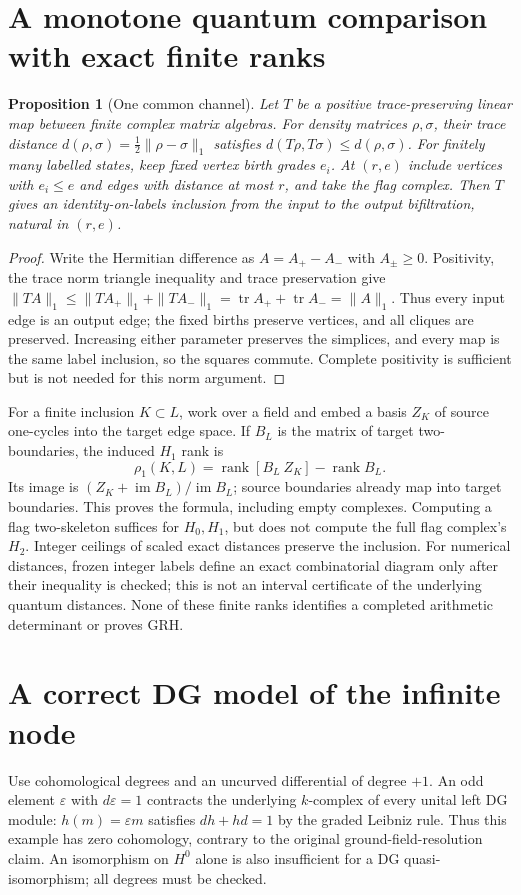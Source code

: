 \documentclass[11pt,oneside,openany]{book}
\newtheorem{proposition}[theorem]{Proposition}
\theoremstyle{definition}\newtheorem{definition}[theorem]{Definition}
\theoremstyle{remark}\newtheorem{remark}[theorem]{Remark}
\begin{document}
\section{A monotone quantum comparison with exact finite ranks}
\begin{proposition}[One common channel]\label{thm:channel-filtration}
Let $T$ be a positive trace-preserving linear map between finite complex
matrix algebras. For density matrices $\rho,\sigma$, their trace distance
$d(\rho,\sigma)=\tfrac12\|\rho-\sigma\|_1$ satisfies
$d(T\rho,T\sigma)\le d(\rho,\sigma)$.
For finitely many labelled states, keep fixed vertex birth grades $e_i$.
At $(r,e)$ include vertices with $e_i\le e$ and edges with distance at most
$r$, and take the flag complex. Then $T$ gives an identity-on-labels inclusion
from the input to the output bifiltration, natural in $(r,e)$.
\end{proposition}
\begin{proof}
Write the Hermitian difference as $A=A_+-A_-$ with $A_\pm\ge0$.
Positivity, the trace norm triangle inequality and trace preservation give
$\|T A\|_1\le\|T A_+\|_1+\|T A_-\|_1
=\operatorname{tr}A_++\operatorname{tr}A_-=\|A\|_1$.
Thus every input edge is an output edge; the fixed births preserve vertices,
and all cliques are preserved. Increasing either parameter preserves the
simplices, and every map is the same label inclusion, so the squares commute.
Complete positivity is sufficient but is not needed for this norm argument.
\end{proof}
For a finite inclusion $K\subset L$, work over a field and embed a basis
$Z_K$ of source one-cycles into the target edge space. If $B_L$ is the
matrix of target two-boundaries, the induced $H_1$ rank is
\[
 \rho_1(K,L)=\operatorname{rank}[B_L\ Z_K]-\operatorname{rank}B_L.
\]
Its image is $(Z_K+\operatorname{im}B_L)/\operatorname{im}B_L$; source
boundaries already map into target boundaries. This proves the formula,
including empty complexes. Computing a flag two-skeleton suffices for
$H_0,H_1$, but does not compute the full flag complex's $H_2$.
Integer ceilings of scaled exact distances preserve the inclusion.
For numerical distances, frozen integer labels define an exact combinatorial
diagram only after their inequality is checked; this is not an interval
certificate of the underlying quantum distances. None of these finite ranks
identifies a completed arithmetic determinant or proves GRH.

\section{A correct DG model of the infinite node}
Use cohomological degrees and an uncurved differential of degree $+1$.
An odd element $\varepsilon$ with $d\varepsilon=1$ contracts the underlying $k$-complex of every unital
left DG module: $h(m)=\varepsilon m$ satisfies $dh+hd=1$ by the graded
Leibniz rule. Thus this example has zero cohomology, contrary to the
original ground-field-resolution claim. An isomorphism on $H^0$ alone is
also insufficient for a DG quasi-isomorphism; all degrees must be checked.
\end{document}
